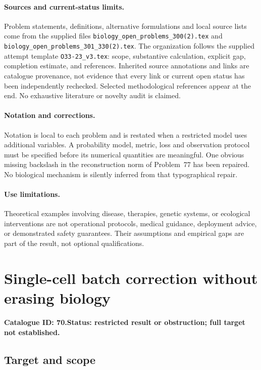 \documentclass[11pt]{article}
\begin{document}
\paragraph{Sources and current-status limits.}
Problem statements, definitions, alternative formulations and local source lists
come from the supplied files
\texttt{biology\_open\_problems\_300(2).tex} and
\texttt{biology\_open\_problems\_301\_330(2).tex}.
The organization follows the supplied attempt template
\texttt{O33-23\_v3.tex}: scope, substantive calculation, explicit gap,
completion estimate, and references. Inherited source annotations and links are
catalogue provenance, not evidence that every link or current open status has
been independently rechecked. Selected methodological references appear at the
end. No exhaustive literature or novelty audit is claimed.

\paragraph{Notation and corrections.}
Notation is local to each problem and is restated when a restricted model uses
additional variables. A probability model, metric, loss and observation protocol
must be specified before its numerical quantities are meaningful. One obvious
missing backslash in the reconstruction norm of Problem~77 has been repaired.
No biological mechanism is silently inferred from that typographical repair.

\paragraph{Use limitations.}
Theoretical examples involving disease, therapies, genetic systems, or ecological
interventions are not operational protocols, medical guidance, deployment advice,
or demonstrated safety guarantees. Their assumptions and empirical gaps are part
of the result, not optional qualifications.

\setcounter{section}{69}
\section{Single-cell batch correction without erasing biology}
\label{prob:070}
\noindent\textbf{Catalogue ID: 70.}\quad \textbf{Status: restricted result or obstruction; full target not established.}
\subsection{Target and scope}
\end{document}
